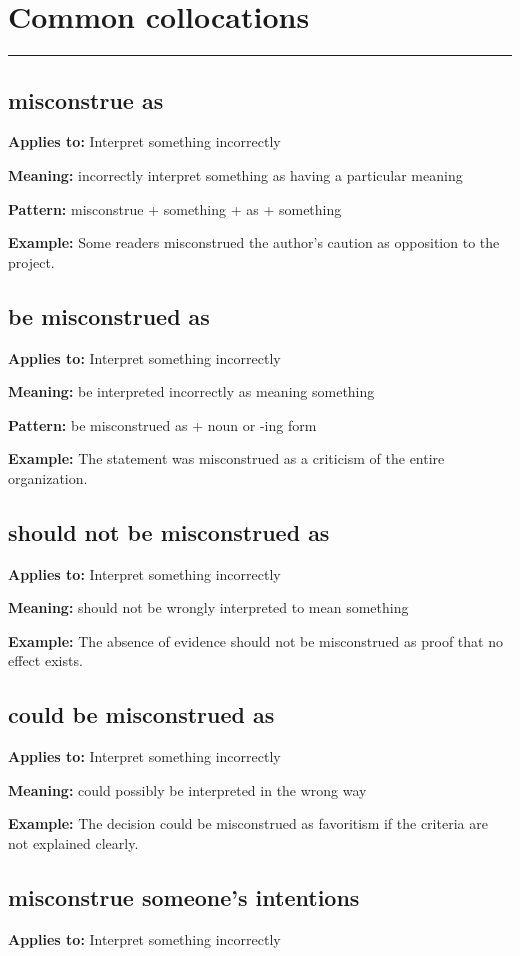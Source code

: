\documentclass[11pt]{article}
\newcommand{\sectionrule}{\par\vspace{-0.5em}\noindent\textcolor{Accent}{\rule{\linewidth}{0.6pt}}\par}
\begin{document}
\section{Common collocations}
\sectionrule
\subsection{misconstrue as}
\textbf{Applies to:} Interpret something incorrectly

\textbf{Meaning:} incorrectly interpret something as having a particular meaning

\textbf{Pattern:} misconstrue + something + as + something

\textbf{Example:} Some readers misconstrued the author's caution as opposition to the project.

\subsection{be misconstrued as}
\textbf{Applies to:} Interpret something incorrectly

\textbf{Meaning:} be interpreted incorrectly as meaning something

\textbf{Pattern:} be misconstrued as + noun or -ing form

\textbf{Example:} The statement was misconstrued as a criticism of the entire organization.

\subsection{should not be misconstrued as}
\textbf{Applies to:} Interpret something incorrectly

\textbf{Meaning:} should not be wrongly interpreted to mean something

\textbf{Example:} The absence of evidence should not be misconstrued as proof that no effect exists.

\subsection{could be misconstrued as}
\textbf{Applies to:} Interpret something incorrectly

\textbf{Meaning:} could possibly be interpreted in the wrong way

\textbf{Example:} The decision could be misconstrued as favoritism if the criteria are not explained clearly.

\subsection{misconstrue someone's intentions}
\textbf{Applies to:} Interpret something incorrectly
\end{document}
